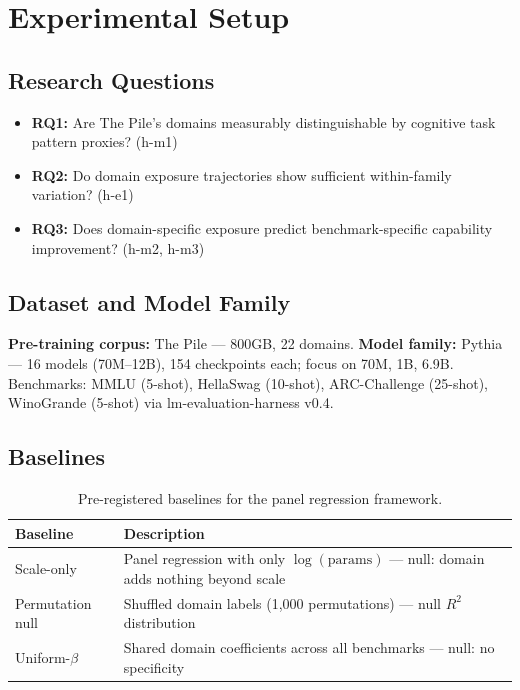 \section{Experimental Setup}

\subsection{Research Questions}

\begin{itemize}
  \item \textbf{RQ1:} Are The Pile's domains measurably distinguishable by cognitive task pattern proxies? (h-m1)
  \item \textbf{RQ2:} Do domain exposure trajectories show sufficient within-family variation? (h-e1)
  \item \textbf{RQ3:} Does domain-specific exposure predict benchmark-specific capability improvement? (h-m2, h-m3)
\end{itemize}

\subsection{Dataset and Model Family}

\textbf{Pre-training corpus:} The Pile \cite{Gao2020Pile} --- 800GB, 22 domains. \textbf{Model family:} Pythia \cite{Biderman2023Pythia} --- 16 models (70M--12B), 154 checkpoints each; focus on 70M, 1B, 6.9B. Benchmarks: MMLU (5-shot), HellaSwag (10-shot), ARC-Challenge (25-shot), WinoGrande (5-shot) via lm-evaluation-harness v0.4.

\subsection{Baselines}

\begin{table}[h]
\centering
\caption{Pre-registered baselines for the panel regression framework.}
\label{tab:baselines}
\begin{tabular}{ll}
\toprule
\textbf{Baseline} & \textbf{Description} \\
\midrule
Scale-only & Panel regression with only $\log(\text{params})$ --- null: domain adds nothing beyond scale \\
Permutation null & Shuffled domain labels (1,000 permutations) --- null $R^2$ distribution \\
Uniform-$\beta$ & Shared domain coefficients across all benchmarks --- null: no specificity \\
\bottomrule
\end{tabular}
\end{table}

